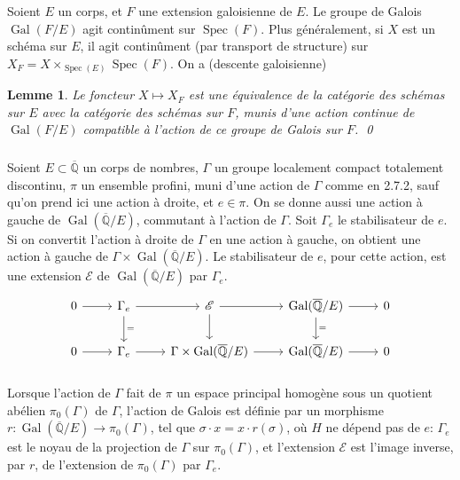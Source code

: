 \documentclass[12pt,a4paper]{article}
\theoremstyle{plain}
\newtheorem{lemma}[theorem]{Lemme}
\theoremstyle{definition}
\theoremstyle{remark}
\DeclareMathOperator{\Gal}{Gal}
\DeclareMathOperator{\Spec}{Spec}
\newcommand{\QQ}{\mathbb{Q}}
\begin{document}
\subsubsection{}

Soient $E$ un corps, et $F$ une extension galoisienne de $E$. Le groupe de Galois $\Gal(F/E)$ agit contin\^ument sur $\Spec(F)$. Plus g\'en\'eralement, si $X$ est un sch\'ema sur $E$, il agit contin\^ument (par transport de structure) sur $X_F = X \times_{\Spec(E)} \Spec(F)$. On a (descente galoisienne)

\begin{lemma}
Le foncteur $X \mapsto X_F$ est une \'equivalence de la cat\'egorie des sch\'emas sur $E$ avec la cat\'egorie des sch\'emas sur $F$, munis d'une action continue de $\Gal(F/E)$ compatible \`a l'action de ce groupe de Galois sur $F$.
\qed
\end{lemma}

\subsubsection{}

Soient $E \subset \overline{\QQ}$ un corps de nombres, $\Gamma$ un groupe localement compact totalement discontinu, $\pi$ un ensemble profini, muni d'une action de $\Gamma$ comme en 2.7.2, sauf qu'on prend ici une action \`a droite, et $e \in \pi$. On se donne aussi une action \`a gauche de $\Gal(\overline{\QQ}/E)$, commutant \`a l'action de $\Gamma$. Soit $\Gamma_e$ le stabilisateur de $e$. Si on convertit l'action \`a droite de $\Gamma$ en une action \`a gauche, on obtient une action \`a gauche de $\Gamma \times \Gal(\overline{\QQ}/E)$. Le stabilisateur de $e$, pour cette action, est une extension $\mathscr{E}$ de $\Gal(\overline{\QQ}/E)$ par $\Gamma_e$.
\[
\begin{tikzcd}
0 \arrow[r] & \Gamma_e \arrow[r] \arrow[d, "="] & \mathscr{E} \arrow[r] \arrow[d] & \Gal(\overline{\QQ}/E) \arrow[r] \arrow[d, "="] & 0 \\
0 \arrow[r] & \Gamma_e \arrow[r] & \Gamma \times \Gal(\overline{\QQ}/E) \arrow[r] & \Gal(\overline{\QQ}/E) \arrow[r] & 0
\end{tikzcd}
\]

\subsubsection{}

Lorsque l'action de $\Gamma$ fait de $\pi$ un espace principal homog\`ene sous un quotient ab\'elien $\pi_0(\Gamma)$ de $\Gamma$, l'action de Galois est d\'efinie par un morphisme $r: \Gal(\overline{\QQ}/E) \to \pi_0(\Gamma)$, tel que $\sigma \cdot x = x \cdot r(\sigma)$, o\`u $H$ ne d\'epend pas de $e$: $\Gamma_e$ est le noyau de la projection de $\Gamma$ sur $\pi_0(\Gamma)$, et l'extension $\mathscr{E}$ est l'image inverse, par $r$, de l'extension de $\pi_0(\Gamma)$ par $\Gamma_e$.
\end{document}
